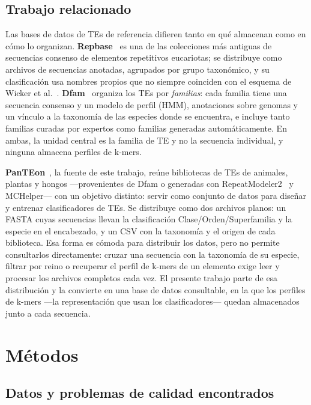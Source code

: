 \documentclass[pdflatex,sn-vancouver-num,lineno,referee]{sn-jnl}
\begin{document}
\subsection{Trabajo relacionado}

Las bases de datos de TEs de referencia difieren tanto en qué almacenan como
en cómo lo organizan. \textbf{Repbase}~\cite{bao2015repbase} es una de las
colecciones más antiguas de secuencias consenso de elementos repetitivos
eucariotas; se distribuye como archivos de secuencias anotadas, agrupados por
grupo taxonómico, y su clasificación usa nombres propios que no siempre
coinciden con el esquema de Wicker et al.~\cite{wicker2007}.
\textbf{Dfam}~\cite{storer2021dfam} organiza los TEs por \emph{familias}: cada
familia tiene una secuencia consenso y un modelo de perfil (HMM), anotaciones
sobre genomas y un vínculo a la taxonomía de las especies donde se
encuentra, e incluye tanto familias curadas por expertos como familias
generadas automáticamente. En ambas, la unidad central es la familia de TE y
no la secuencia individual, y ninguna almacena perfiles de k-mers.

\textbf{PanTEon}~\cite{orozco2026panteon,panteon2026zenodo}, la fuente de este
trabajo, reúne bibliotecas de TEs de animales, plantas y hongos ---provenientes
de Dfam o generadas con RepeatModeler2~\cite{flynn2020repeatmodeler2} y
MCHelper--- con un objetivo distinto: servir como conjunto de datos para
diseñar y entrenar clasificadores de TEs. Se distribuye como dos archivos
planos: un FASTA cuyas secuencias llevan la clasificación
Clase/Orden/Superfamilia y la especie en el encabezado, y un CSV con la
taxonomía y el origen de cada biblioteca. Esa forma es cómoda para distribuir
los datos, pero no permite consultarlos directamente: cruzar una secuencia con
la taxonomía de su especie, filtrar por reino o recuperar el perfil de k-mers
de un elemento exige leer y procesar los archivos completos cada vez. El
presente trabajo parte de esa distribución y la convierte en una base de datos
consultable, en la que los perfiles de k-mers ---la representación que usan
los clasificadores--- quedan almacenados junto a cada secuencia.

\section{Métodos}\label{sec:metodos}

\subsection{Datos y problemas de calidad encontrados}
\end{document}
